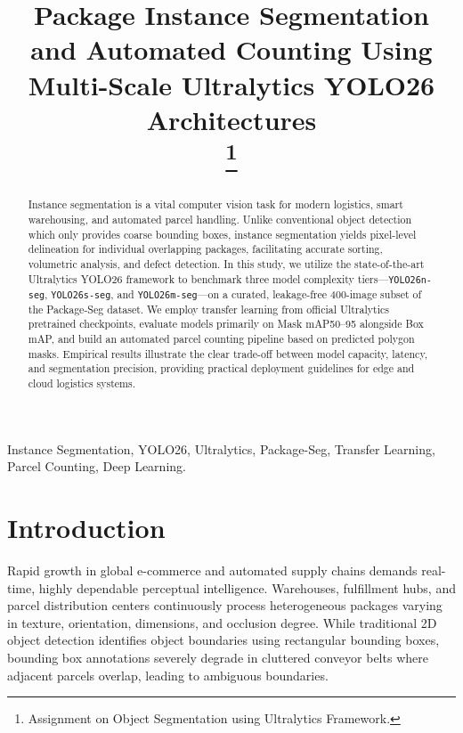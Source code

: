 \documentclass[conference]{IEEEtran}
\begin{document}
\title{Package Instance Segmentation and Automated Counting Using Multi-Scale Ultralytics YOLO26 Architectures\\
\thanks{Assignment on Object Segmentation using Ultralytics Framework.}
}

\author{
}

\maketitle

\begin{abstract}
Instance segmentation is a vital computer vision task for modern logistics, smart warehousing, and automated parcel handling. Unlike conventional object detection which only provides coarse bounding boxes, instance segmentation yields pixel-level delineation for individual overlapping packages, facilitating accurate sorting, volumetric analysis, and defect detection. In this study, we utilize the state-of-the-art Ultralytics YOLO26 framework to benchmark three model complexity tiers—\texttt{YOLO26n-seg}, \texttt{YOLO26s-seg}, and \texttt{YOLO26m-seg}—on a curated, leakage-free 400-image subset of the Package-Seg dataset. We employ transfer learning from official Ultralytics pretrained checkpoints, evaluate models primarily on Mask mAP50--95 alongside Box mAP, and build an automated parcel counting pipeline based on predicted polygon masks. Empirical results illustrate the clear trade-off between model capacity, latency, and segmentation precision, providing practical deployment guidelines for edge and cloud logistics systems.
\end{abstract}

\begin{IEEEkeywords}
Instance Segmentation, YOLO26, Ultralytics, Package-Seg, Transfer Learning, Parcel Counting, Deep Learning.
\end{IEEEkeywords}

\section{Introduction}
Rapid growth in global e-commerce and automated supply chains demands real-time, highly dependable perceptual intelligence. Warehouses, fulfillment hubs, and parcel distribution centers continuously process heterogeneous packages varying in texture, orientation, dimensions, and occlusion degree. While traditional 2D object detection identifies object boundaries using rectangular bounding boxes, bounding box annotations severely degrade in cluttered conveyor belts where adjacent parcels overlap, leading to ambiguous boundaries. 
\end{document}
